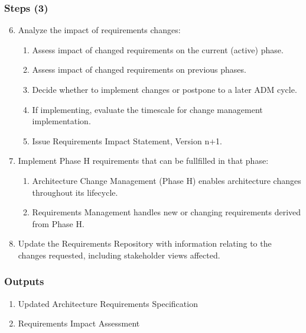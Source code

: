 \documentclass[aspectratio=169, table]{beamer}
\begin{document}
	\begin{frame}
		\frametitle{Steps (3)}
		\vspace{20pt}
		\begin{enumerate}
			\setcounter{enumi}{5}
			\item Analyze the impact of requirements changes:
			\begin{enumerate}
				\item Assess impact of changed requirements on the current (active) phase.
				\item Assess impact of changed requirements on previous phases.
				\item Decide whether to implement changes or postpone to a later ADM cycle.
				\item If implementing, evaluate the timescale for change management implementation.
				\item Issue Requirements Impact Statement, Version n+1.
			\end{enumerate}
			\item Implement Phase H requirements that can be fullfilled in that phase:
			\begin{enumerate}
				\item Architecture Change Management (Phase H) enables architecture changes throughout its lifecycle.
				\item Requirements Management handles new or changing requirements derived from Phase H.
			\end{enumerate}
					\item Update the Requirements Repository
			with information relating to the changes
			requested, including stakeholder views
			affected.
		\end{enumerate}
	\end{frame}


	\begin{frame}
		\frametitle{Outputs}
		\vspace{22pt}
		\begin{enumerate}
			\item Updated Architecture Requirements Specification
			\item Requirements Impact Assessment
		\end{enumerate}
	\end{frame}
	
\end{document}
